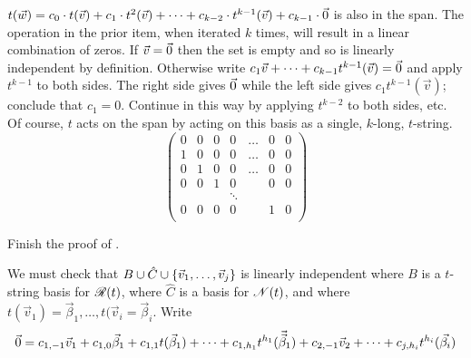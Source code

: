 \begin{exercises}
\begin{answer}
\begin{exparts}
          $t(\vec{w})=c_0\cdot t(\vec{v})+c_1\cdot t^2(\vec{v})+\dots
           +c_{k-2}\cdot t^{k-1}(\vec{v})+c_{k-1}\cdot \vec{0}$
          is also in the span.
        \partsitem The operation in the prior item, when iterated $k$ times,
          will result in a linear combination of zeros.    
        \partsitem If \( \vec{v}=\vec{0} \) then the set is empty and so is
          linearly independent by definition.
          Otherwise write \( c_1\vec{v}+\dots+c_{k-1}t^{k-1}(\vec{v})=\vec{0} \)
          and apply \( t^{k-1} \) to both sides.
          The right side gives \( \vec{0} \) while the left side gives
          \( c_1t^{k-1}(\vec{v}) \); conclude that \( c_1=0 \).
          Continue in this way by applying \( t^{k-2} \) to both sides,
          etc.  
        \partsitem Of course, $t$ acts on the span by acting on
          this basis as a single, $k$-long, $t$-string.
          \begin{equation*}
            \begin{pmatrix}
              0 &0 &0 &0 &\ldots &0 &0 \\
              1 &0 &0 &0 &\ldots &0 &0 \\
              0 &1 &0 &0 &\ldots &0 &0 \\
              0 &0 &1 &0 &       &0 &0 \\
                &  &  &\ddots          \\
              0 &0 &0 &0 &       &1 &0 \\
            \end{pmatrix}
          \end{equation*}
      \end{exparts}
    \end{answer}
  \item \label{exer:NilMapWillHaveStrBas}
    Finish the proof of .
    \begin{answer}
      We must check that
      \( B\cup\hat{C}\cup\mbox{$\{\vec{v}_1,\dots,\vec{v}_j\}$} \) is linearly
      independent where \( B \) is a \( t \)-string basis for
      \( \mathscr{R}(t) \), where \( \hat{C} \) is a basis for
      \( \mathscr{N}(t) \), and where
      \( t(\vec{v}_1)=\vec{\beta}_1,\dots,t(\vec{v}_i=\vec{\beta}_i \).
      Write
      \begin{equation*}
        \zero=c_{1,-1}\vec{v}_1+c_{1,0}\vec{\beta}_1
               +c_{1,1}t(\vec{\beta}_1)+\dots+
               c_{1,{h_1}}t^{h_1}(\vec{\vec{\beta}}_1)
               +c_{2,-1}\vec{v}_2+\dots+c_{j,h_i}t^{h_i}(\vec{\beta_i})

\end{equation*}
\end{answer}
\end{exercises}
